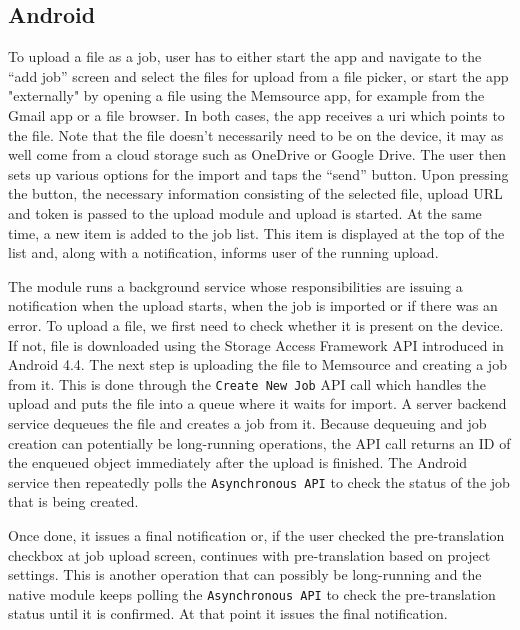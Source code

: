 \subsection{Android}
To upload a file as a job, user has to either start the app and navigate to the “add job” screen and select the files for upload from a file picker, or start the app "externally" by opening a file using the Memsource app, for example from the Gmail app or a file browser. 
In both cases, the app receives a uri which points to the file. Note that the file doesn't necessarily need to be on the device, it may as well come from a cloud storage such as OneDrive or Google Drive. The user then sets up various options for the import and taps the “send” button. 
Upon pressing the button, the necessary information consisting of the selected file, upload URL and token is passed to the upload module and upload is started. At the same time, a new item is added to the job list. This item is displayed at the top of the list and, along with a notification, informs user of the running upload.


The module runs a background service whose responsibilities are issuing a notification when the upload starts, when the job is imported or if there was an error. To upload a file, we first need to check whether it is present on the device. If not, file is downloaded using the Storage Access Framework API introduced in Android 4.4. The next step is uploading the file to Memsource and creating a job from it. This is done through  the \texttt{Create New Job} API call which handles the upload and puts the file into a queue where it waits for import. A server backend service dequeues the file and creates a job from it. Because dequeuing and job creation can potentially be long-running operations, the API call returns an ID of the enqueued object immediately after the upload is finished. The Android service then repeatedly polls the \texttt{Asynchronous API} to check the status of the job that is being created. 

Once done, it issues a final notification or, if the user checked the pre-translation checkbox at job upload screen, continues with pre-translation based on project settings. This is another operation that can possibly be long-running and the native module keeps polling the \texttt{Asynchronous API} to check the pre-translation status until it is confirmed. At that point it issues the final notification.


